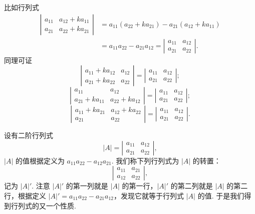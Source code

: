 \documentclass[UTF8,12pt,a4paper,fontset=fandol]{ctexart}
\begin{document}
比如行列式
\[
\begin{aligned}
\left|\begin{array}{cc}
a_{11} & a_{12}+ka_{11}\\
a_{21} & a_{22}+ka_{21}
\end{array}\right|
&=a_{11}(a_{22}+ka_{21})-a_{21}(a_{12}+ka_{11})\\
&=a_{11}a_{22}-a_{21}a_{12}
=\left|\begin{array}{cc}
a_{11} & a_{12}\\
a_{21} & a_{22}
\end{array}\right|.
\end{aligned}
\]
同理可证
\[
\left|\begin{array}{cc}
a_{11}+ka_{12} & a_{12}\\
a_{21}+ka_{22} & a_{22}
\end{array}\right|
=
\left|\begin{array}{cc}
a_{11} & a_{12}\\
a_{21} & a_{22}
\end{array}\right|;
\]
\[
\left|\begin{array}{cc}
a_{11} & a_{12}\\
a_{21}+ka_{11} & a_{22}+ka_{12}
\end{array}\right|
=
\left|\begin{array}{cc}
a_{11} & a_{12}\\
a_{21} & a_{22}
\end{array}\right|;
\]
\[
\left|\begin{array}{cc}
a_{11}+ka_{21} & a_{12}+ka_{22}\\
a_{21} & a_{22}
\end{array}\right|
=
\left|\begin{array}{cc}
a_{11} & a_{12}\\
a_{21} & a_{22}
\end{array}\right|.
\]

设有二阶行列式
\[
|A|=\left|\begin{array}{cc}
a_{11} & a_{12}\\
a_{21} & a_{22}
\end{array}\right|,
\]
$|A|$ 的值根据定义为 $a_{11}a_{22}-a_{12}a_{21}$. 我们称下列行列式为 $|A|$ 的转置：
\[
\left|\begin{array}{cc}
a_{11} & a_{21}\\
a_{12} & a_{22}
\end{array}\right|,
\]
记为 $|A|'$. 注意 $|A|'$ 的第一列就是 $|A|$ 的第一行，$|A|'$ 的第二列就是 $|A|$ 的第二行，根据定义 $|A|'=a_{11}a_{22}-a_{21}a_{12}$，发现它就等于行列式 $|A|$ 的值. 于是我们得到行列式的又一个性质.
\end{document}

